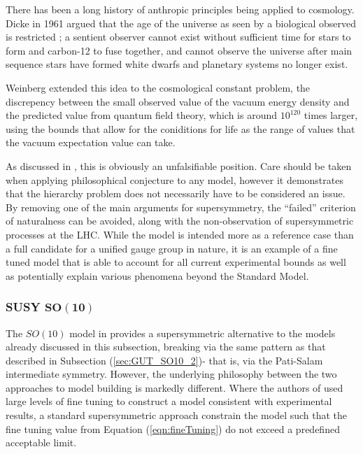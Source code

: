 \documentclass{article}
\begin{document}
There has been a long history of anthropic principles being applied to cosmology. Dicke in 1961 argued that the age of the universe as seen by a biological observed is restricted \cite{DickeManUniverse}; a sentient observer cannot exist without sufficient time for stars to form and carbon-12 to fuse together, and cannot observe the universe after main sequence stars have formed white dwarfs and planetary systems no longer exist. 

Weinberg extended this idea to the cosmological constant problem, the discrepency between the small observed value of the vacuum energy density and the predicted value from quantum field theory, which is around $10^{120}$ times larger, using the bounds that allow for the coniditions for life as the range of values that the vacuum expectation value can take.

As discussed in \cite{AnthropicResponse}, this is obviously an unfalsifiable position. Care should be taken when applying philosophical conjecture to any model, however it demonstrates that the hierarchy problem does not necessarily have to be considered an issue. By removing one of the main arguments for supersymmetry, the ``failed'' criterion of naturalness can be avoided, along with the non-observation of supersymmetric processes at the LHC.
While the model is intended more as a reference case than a full candidate for a unified gauge group in nature, it is an example of a fine tuned model that is able to account for all current experimental bounds as well as potentially explain various phenomena beyond the Standard Model.

\subsubsection{SUSY $\bm{SO(10)}$}%
\label{sec:GUT_SO10_3}

The $SO(10)$ model in \cite{SUSYSO10} provides a supersymmetric alternative to the models already discussed in this subsection, breaking via the same pattern as that described in Subsection (\ref{sec:GUT_SO10_2})- that is, via the Pati-Salam intermediate symmetry. However, the underlying philosophy between the two approaches to model building is markedly different. Where  the authors of \cite{SO10_2} used large levels of fine tuning to construct a model consistent with experimental results, a standard supersymmetric approach constrain the model such that the fine tuning value from Equation (\ref{eqn:fineTuning}) do not exceed a predefined acceptable limit. 
\end{document}

